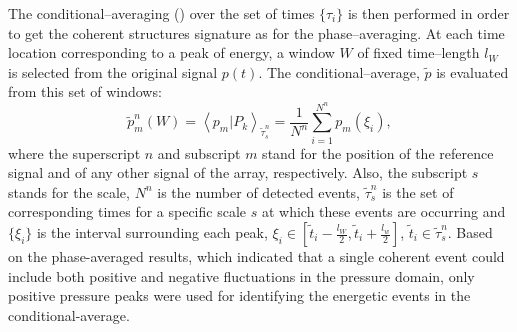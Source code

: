The conditional--averaging () over the set of times $\{\tau_{i}\}$ is then performed in order to get the coherent structures signature as for the phase--averaging.
At each time location corresponding to a peak of energy, a window $W$ of fixed time--length $l_{W}$ is selected from the original signal $p \left( t \right)$. The conditional--average, $\tilde{p}$ is evaluated from this set of windows:
\begin{equation} \label{eqn:ensembleAverage}
	\tilde{p}^n_{m}\left( W \right) = \left< p_{m} | P_{k} \right>_{\tilde{\tau}^n_{s}} = \frac{1}{N^n} \sum^{N^n}_{i = 1} p_{m}\left(\xi_{i}\right),
\end{equation}
where the superscript $n$ and subscript $m$ stand for the position of the reference signal and of any other signal of the array, respectively.
Also, the subscript $s$ stands for the scale, $N^n$ is the number of detected events, $\tilde{\tau}^n_{s}$ is the set of corresponding times for a specific scale $s$ at which these events are occurring and $\{\xi_{i}\}$ is the interval surrounding each peak, $\xi_{i} \in \left[ \tilde{t}_{i} - \frac{l_W}{2}, \tilde{t}_{i} + \frac{l_w}{2} \right]$, $\tilde{t}_{i} \in \tilde{\tau}^n_{s}$.
Based on the phase-averaged results, which indicated that a single coherent event could include both positive and negative fluctuations in the pressure domain, only positive pressure peaks were used for identifying the energetic events in the conditional-average.
%
